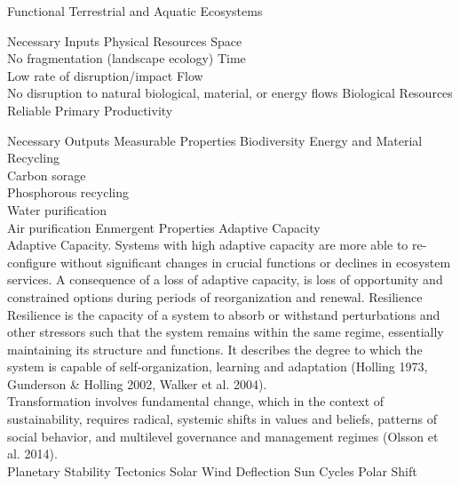 \documentclass[12pt, letterpaper]{article}
\begin{document}
\begin{outline}[enumerate]
\1 Functional Terrestrial and Aquatic Ecosystems

\2 Necessary Inputs
\3 Physical Resources
\4 Space\\
No fragmentation (landscape ecology)
\4 Time\\
Low rate of disruption/impact
\4 Flow\\
No disruption to natural biological, material, or energy flows
\3 Biological Resources
\4 Reliable Primary Productivity

\2 Necessary Outputs
\3 Measurable Properties
\4 Biodiversity
\4 Energy and Material Recycling\\
Carbon sorage\\
Phosphorous recycling\\
Water purification\\
Air purification
\3 Enmergent Properties
\4 Adaptive Capacity\\
Adaptive Capacity. Systems with high adaptive capacity are more able to re-configure without significant changes in crucial functions or declines in ecosystem services. A consequence of a loss of adaptive capacity, is loss of opportunity and constrained options during periods of reorganization and renewal.
\4 Resilience \\
Resilience is the capacity of a system to absorb or withstand perturbations and other stressors such that the system remains within the same regime, essentially maintaining its structure and functions. It describes the degree to which the system is capable of self-organization, learning and adaptation (Holling 1973, Gunderson \& Holling 2002, Walker et al. 2004). \\

Transformation involves fundamental change, which in the context of sustainability, requires radical, systemic shifts in values and beliefs, patterns of social behavior, and multilevel governance and management regimes (Olsson et al. 2014).\\

\1 Planetary Stability
\2 Tectonics
\2 Solar Wind Deflection
\3 Sun Cycles
\3 Polar Shift

\end{outline}




\clearpage 
\renewcommand{\thepage}{}
\printbibliography
\end{document}
